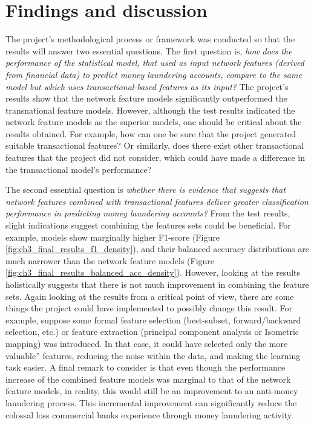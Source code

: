 \section{Findings and discussion}

The project's methodological process or framework was conducted so that the results will answer two essential questions. The first question is, \textit{how does the  performance of the statistical model, that used as input network features (derived from financial data) to predict money laundering accounts, compare to the same model but which uses transactional-based features as its input?} The project's results show that the network feature models significantly outperformed the transnational feature models. However, although the test results indicated the network feature models as the superior models, one should be critical about the results obtained. For example, how can one be sure that the project generated suitable transactional features? Or similarly, does there exist other transactional features that the project did not consider, which could have made a difference in the transactional model's performance? 

The second essential question is \textit{whether there is evidence that suggests that network features combined with transactional features deliver greater classification performance in predicting money laundering accounts?} From the test results, slight indications suggest combining the features sets could be beneficial. For example, models show marginally higher F1-score (Figure \ref{fig:ch3_final_results_f1_density}), and their balanced accuracy distributions are much narrower than the  network feature models (Figure \ref{fig:ch3_final_results_balanced_acc_density}). However, looking at the results holistically suggests that there is not much improvement in combining the feature sets. Again looking at the results from a critical point of view, there are some things the project could have implemented to possibly change this result. For example, suppose some formal feature selection (best-subset, forward/backward selection, etc.) or feature extraction (principal component analysis or Isometric mapping) was introduced. In that case, it could have selected only the more valuable'' features, reducing the noise within the data, and making the learning task easier. A final remark to consider is that even though the performance increase of the combined feature models was marginal to that of the network feature models, in reality, this would still be an improvement to an anti-money laundering process. This incremental improvement can significantly reduce the colossal loss commercial banks experience through money laundering activity.   


